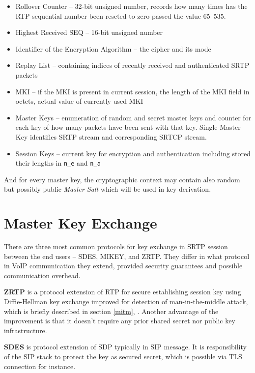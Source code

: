 \begin{itemize}
\item Rollover Counter -- 32-bit unsigned number, records how many times 
has the RTP sequential number been reseted to zero passed the value 65~535.
\item Highest Received SEQ -- 16-bit unsigned number
\item Identifier of the Encryption Algorithm -- the cipher and its mode
\item Replay List -- containing indices of recently received and 
authenticated SRTP packets
\item MKI -- if the MKI is present in current session, the length
of the MKI field in octets, actual value of currently used MKI
\item Master Keys -- enumeration of random and secret master keys
and counter for each key of how many packets have been sent with
that key. Single Master Key identifies SRTP stream and corresponding SRTCP
stream.
\item Session Keys -- current key for encryption and authentication
including stored their lengths in \texttt{n\_e} and \texttt{n\_a}
\end{itemize}

And for every master key, the cryptographic context may contain also
random but possibly public \textit{Master Salt} which will be used in 
key derivation.

\section{Master Key Exchange}
There are three most common protocols for key exchange in SRTP session between 
the end users -- SDES, MIKEY, and ZRTP. They differ in what protocol in VoIP 
communication they extend, provided security guarantees and possible 
communication overhead.

\textbf{ZRTP} is a protocol extension of RTP for secure establishing session key 
using Diffie-Hellman key exchange improved for detection of man-in-the-middle 
attack, which is briefly described in section \ref{mitm}, \cite{rfc6189}.
Another advantage of the improvement is that it doesn't require any prior shared 
secret nor public key infrastructure.

\textbf{SDES} is protocol extension of SDP\cite{rfc:sdp, rfc:sdes} typically in 
SIP\cite{rfc:sip} message. It is responsibility of the SIP stack to protect the 
key as secured secret, which is possible via TLS connection for instance.

